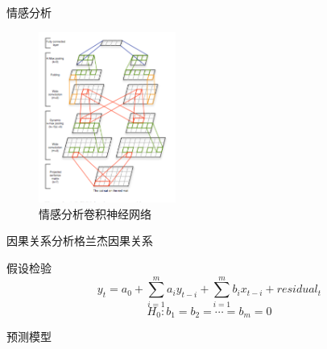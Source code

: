 \documentclass{beamer}
\begin{document}
\begin{frame}{情感分析}
\begin{figure}
  \includegraphics[width=0.4\textwidth]{0.png}
  \caption{情感分析卷积神经网络}
\end{figure}
\end{frame}

\begin{frame}{因果关系分析}{格兰杰因果关系}
\begin{block}{假设检验}
  \[
    y_{t}=a_{0}+\sum_{i=1}^{m}a_{i}y_{t-i}+\sum_{i=1}^{m}b_{i}x_{t-i}+residual_{t}
  \]
  \[
    H_{0}:b_{1}=b_{2}=\cdots =b_{m}=0
  \]
\end{block}
\end{frame}

\begin{frame}{预测模型}
\end{frame}
\end{document}
